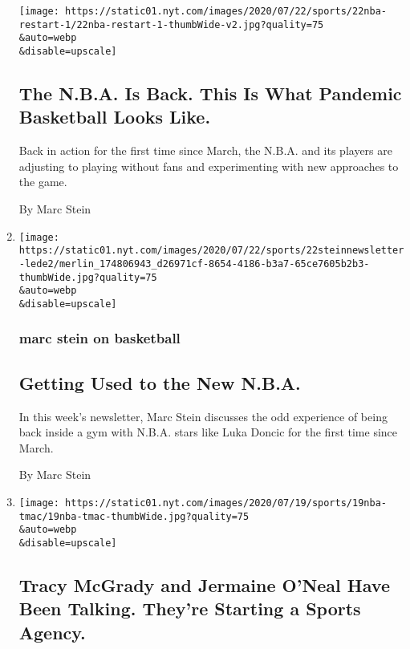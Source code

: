 \begin{enumerate}
  \texttt{[image: https://static01.nyt.com/images/2020/07/22/sports/22nba-restart-1/22nba-restart-1-thumbWide-v2.jpg?quality=75\\\&auto=webp\\\&disable=upscale]}

  \hypertarget{the-nba-is-back-this-is-what-pandemic-basketball-looks-like}{%
  \subsection{The N.B.A. Is Back. This Is What Pandemic Basketball Looks
  Like.}\label{the-nba-is-back-this-is-what-pandemic-basketball-looks-like}}

  Back in action for the first time since March, the N.B.A. and its
  players are adjusting to playing without fans and experimenting with
  new approaches to the game.

  By Marc Stein
\item
  \href{/2020/07/22/sports/basketball/nba-bubble-practice.html}{}

  \texttt{[image: https://static01.nyt.com/images/2020/07/22/sports/22steinnewsletter-lede2/merlin\_174806943\_d26971cf-8654-4186-b3a7-65ce7605b2b3-thumbWide.jpg?quality=75\\\&auto=webp\\\&disable=upscale]}

  \hypertarget{marc-stein-on-basketball-1}{%
  \subsubsection{marc stein on
  basketball}\label{marc-stein-on-basketball-1}}

  \hypertarget{getting-used-to-the-new-nba}{%
  \subsection{Getting Used to the New
  N.B.A.}\label{getting-used-to-the-new-nba}}

  In this week's newsletter, Marc Stein discusses the odd experience of
  being back inside a gym with N.B.A. stars like Luka Doncic for the
  first time since March.

  By Marc Stein
\item
  \href{/2020/07/19/sports/basketball/tracy-mcgrady-jermaine-oneal-sports-agency.html}{}

  \texttt{[image: https://static01.nyt.com/images/2020/07/19/sports/19nba-tmac/19nba-tmac-thumbWide.jpg?quality=75\\\&auto=webp\\\&disable=upscale]}

  \hypertarget{tracy-mcgrady-and-jermaine-oneal-have-been-talking-theyre-starting-a-sports-agency}{%
  \subsection{Tracy McGrady and Jermaine O'Neal Have Been Talking.
  They're Starting a Sports
  Agency.}\label{tracy-mcgrady-and-jermaine-oneal-have-been-talking-theyre-starting-a-sports-agency}}


\end{enumerate}
